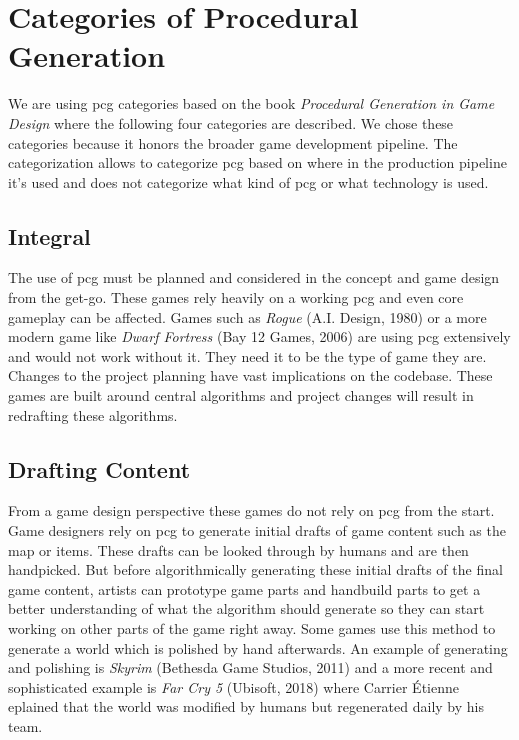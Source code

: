 \documentclass[10pt,a4paper]{article}
\begin{document}
\section{Categories of Procedural Generation}\label{sec:categories}
\begin{multicols}{2}
We are using \gls{pcg} categories based on the book \textit{Procedural Generation in Game Design}\citep[p.~3]{Short:2017:PGG:3161477} where the following four categories are described. We chose these categories because it honors the broader game development pipeline. The categorization allows to categorize \gls{pcg} based on where in the production pipeline it’s used and does not categorize what kind of \gls{pcg} or what technology is used.
\end{multicols}
\subsection{Integral}
\begin{multicols}{2} The use of \gls{pcg} must be planned and considered in the concept and game design from the get-go. These games rely heavily on a working \gls{pcg} and even core gameplay can be affected. Games such as \textit{Rogue} (A.I. Design, 1980) or a more modern game like \textit{Dwarf Fortress} (Bay 12 Games, 2006) are using \gls{pcg} extensively and would not work without it. They need it to be the type of game they are. Changes to the project planning have vast implications on the codebase. These games are built around central algorithms and project changes will result in redrafting these algorithms.
\end{multicols}
\subsection{Drafting Content}
\begin{multicols}{2} From a game design perspective these games do not rely on \gls{pcg} from the start. Game designers rely on \gls{pcg} to generate initial drafts of game content such as the map or items. These drafts can be looked through by humans and are then handpicked. But before algorithmically generating these initial drafts of the final game content, artists can prototype game parts and handbuild parts to get a better understanding of what the algorithm should generate so they can start working on other parts of the game right away. Some games use this method to generate a world which is polished by hand afterwards. An example of generating and polishing is \textit{Skyrim} (Bethesda Game Studios, 2011) and a more recent and sophisticated example is \textit{Far Cry 5} (Ubisoft, 2018) where Carrier Étienne eplained that the world was modified by humans but regenerated daily by his team\cite{Carrier2018}.
\end{multicols}
\end{document}
